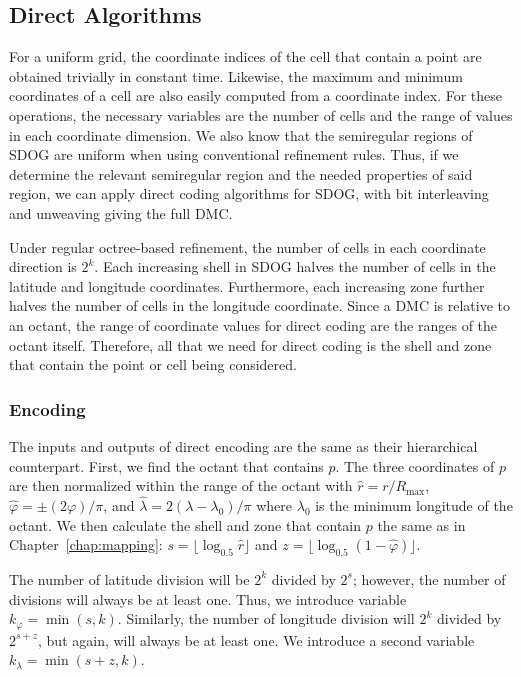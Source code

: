 \subsection{Direct Algorithms}
For a uniform grid, the coordinate indices of the cell that contain a point are obtained trivially in constant time.
Likewise, the maximum and minimum coordinates of a cell are also easily computed from a coordinate index.
For these operations, the necessary variables are the number of cells and the range of values in each coordinate dimension.
We also know that the semiregular regions of SDOG are uniform when using conventional refinement rules.
Thus, if we determine the relevant semiregular region and the needed properties of said region, we can apply direct coding algorithms for SDOG, with bit interleaving and unweaving giving the full DMC.


Under regular octree-based refinement, the number of cells in each coordinate direction is $2^k$.
Each increasing shell in SDOG halves the number of cells in the latitude and longitude coordinates.
Furthermore, each increasing zone further halves the number of cells in the longitude coordinate.
Since a DMC is relative to an octant, the range of coordinate values for direct coding are the ranges of the octant itself.
Therefore, all that we need for direct coding is the shell and zone that contain the point or cell being considered.


\subsubsection{Encoding}
The inputs and outputs of direct encoding are the same as their hierarchical counterpart.
First, we find the octant that contains $p$.
The three coordinates of $p$ are then normalized within the range of the octant with $\hat{r} = r / R_\mathrm{max}$, $\hat{\varphi} = \pm (2\varphi) / \pi$, and $\hat{\lambda} = 2 (\lambda - \lambda_0) / \pi$ where $\lambda_0$ is the minimum longitude of the octant.
We then calculate the shell and zone that contain $p$ the same as in Chapter~\ref{chap:mapping}: $s = \lfloor \log_{0.5} \hat{r} \rfloor$ and $z = \lfloor \log_{0.5} ( 1 - \hat{\varphi} ) \rfloor$.


The number of latitude division will be $2^k$ divided by $2^s$; however, the number of divisions will always be at least one.
Thus, we introduce variable $k_\varphi = \min ( s, k )$.
Similarly, the number of longitude division will $2^k$ divided by $2^{s+z}$, but again, will always be at least one.
We introduce a second variable $k_\lambda = \min ( s + z, k )$.


